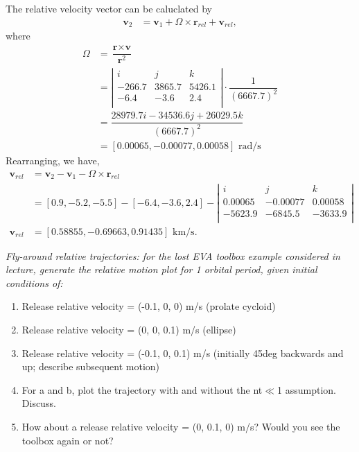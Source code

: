 \documentclass[onecolumn,10pt]{jhwhw}
\begin{document}
The relative velocity vector can be caluclated by
\begin{align*}
\textbf{v}_{2} &= \textbf{v}_1 + \textbf{$\Omega$} \times \textbf{r}_{rel} + \textbf{v}_{rel},
\end{align*}
where
\begin{align*}
\textbf{$\Omega$} &= \dfrac{\textbf{r} \times \textbf{v}}{\textbf{r}^2} \\
 &= \left|
 \begin{array}{ccc}
 i & j & k \\
 -266.7 & 3865.7 & 5426.1 \\
 -6.4 & -3.6 &  2.4 \\
 \end{array}
 \right| \cdot \dfrac{1}{(6667.7)^2} \\
 &= \dfrac{28979.7i -34536.6j + 26029.5k}{(6667.7)^2} \\
 &= [ 0.00065, -0.00077,  0.00058] \mbox{ rad/s}
\end{align*}
Rearranging, we have,
\begin{align*}
\textbf{v}_{rel} &= \textbf{v}_{2} - \textbf{v}_1 - \textbf{$\Omega$} \times \textbf{r}_{rel} \\
\phantom{\textbf{v}_{rel}} &= [0.9, -5.2, -5.5] - [-6.4, -3.6, 2.4] - \left|
 \begin{array}{ccc}
 i & j & k \\
 0.00065 & -0.00077 & 0.00058 \\
 -5623.9 &  -6845.5 & -3633.9 \\
 \end{array}
 \right| \\
\textbf{v}_{rel} &= [0.58855, -0.69663,  0.91435] \mbox{ km/s}.
\end{align*}

\clearpage

\problem{}
\textit{Fly-around relative trajectories: for the lost EVA toolbox example considered in lecture, generate the relative motion plot for 1 orbital period, given initial conditions of:}
\begin{enumerate}
\itemsep0em
\item Release relative velocity = (-0.1, 0, 0) m/s (prolate cycloid)
\item Release relative velocity = (0, 0, 0.1) m/s (ellipse)
\item Release relative velocity = (-0.1, 0, 0.1) m/s (initially 45deg backwards and up; describe subsequent motion)
\item For a and b, plot the trajectory with and without the nt$\ll$1 assumption. Discuss.
\item How about a release relative velocity = (0, 0.1, 0) m/s? Would you see the toolbox again or not?
\end{enumerate}
\clearpage
\end{document}
